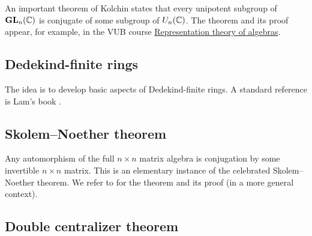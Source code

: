 An important theorem of Kolchin states that 
every unipotent subgroup of $\mathbf{GL}_n(\mathbb{C})$ is conjugate
of some subgroup of $U_n(\mathbb{C})$. The theorem and its proof 
appear, for example, 
in the 
VUB course \href{https://github.com/vendramin/representation}{Representation theory of algebras}.

\subsection*{Dedekind-finite rings}

The idea is to develop basic aspects of Dedekind-finite rings.
A standard reference is Lam's book \cite{MR2278849}. 








\subsection*{Skolem--Noether theorem}

Any automorphism of the full $n\times n$ matrix algebra 
is conjugation by some invertible $n\times n$ matrix. This is an elementary 
instance of the celebrated Skolem--Noether theorem. We refer to 
\cite[Chapter 4]{MR3308118} for the theorem 
and its proof (in a more general context).

\subsection*{Double centralizer theorem}

